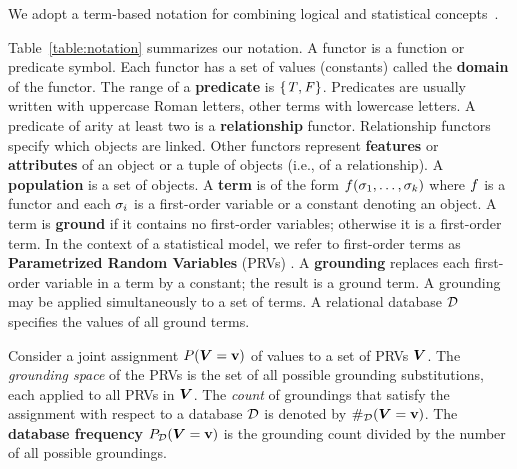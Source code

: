 {%

We adopt a term-based notation for combining logical and statistical concepts~\cite{Poole2003,Kimmig2014}. {Table~\ref{table:notation} summarizes our notation.
A functor is a function or predicate symbol. Each functor has a set of values (constants) called the \textbf{domain} of the functor. The range of a \textbf{predicate} is $\{\mathit{T},\mathit{F}\}$. Predicates are usually written with uppercase Roman letters, other terms with lowercase letters.
A predicate of arity at least two is a \textbf{relationship} functor. Relationship functors specify which objects are linked. Other functors represent \textbf{features} or \textbf{attributes} of an object or a tuple of objects (i.e., of a relationship).
A \textbf{population} is a set of objects. 
A \textbf{term} is of the form $f(\sigma_{1},\ldots,\sigma_{k})$ where $f$ is a functor %
and each $\sigma_{i}$ is a first-order variable or a constant denoting an object. A term is \textbf{ground} if it contains no first-order variables; otherwise it is a first-order term. In the context of a statistical model, we refer to first-order terms as \textbf{Parametrized Random Variables} (PRVs) \cite{Kimmig2014}. 
A \textbf{grounding} replaces each first-order variable in a term by a constant; the result is a ground term. A grounding may be applied simultaneously to a set of terms.  A relational database $\mathcal{D}$ specifies the values of all ground terms. %

Consider a joint assignment 
$P(\boldsymbol{V} = \mathbf{v})$ of values to a set of PRVs $\boldsymbol{V}$. The {\em grounding space} of the PRVs is the set of all possible grounding substitutions, each applied to all PRVs in $\boldsymbol{V}$. The {\em count} of groundings that satisfy the assignment with respect to a database $\mathcal{D}$ is denoted by $\#_{\mathcal{D}}(\boldsymbol{V} = \mathbf{v})$. The \textbf{database frequency} $P_{\mathcal{D}}(\boldsymbol{V} = \mathbf{v})$ is the grounding count divided by the number of all possible groundings. %
 	 	      \begin{table} 
 	 	     

\end{table}}}
